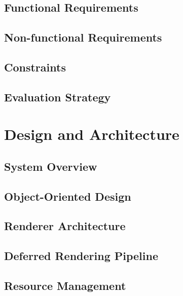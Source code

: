 \documentclass[12pt,a4paper,openright,twoside]{book}
\begin{document}
\section{Functional Requirements}

\section{Non-functional Requirements}

\section{Constraints}

\section{Evaluation Strategy}

\chapter{Design and Architecture}
\label{chap:design}

\section{System Overview}

\section{Object-Oriented Design}

\section{Renderer Architecture}

\section{Deferred Rendering Pipeline}

\section{Resource Management}

\end{document}
